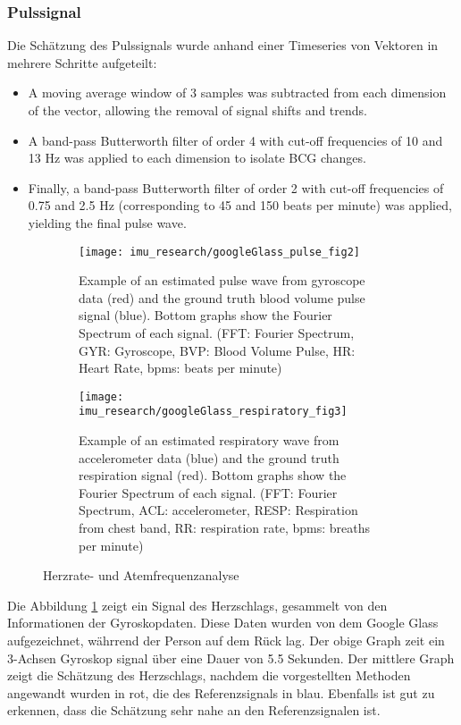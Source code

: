 \subsubsection{Pulssignal}
Die Schätzung des Pulssignals wurde anhand einer Timeseries von Vektoren in mehrere Schritte aufgeteilt:
\begin{itemize}
    \item A moving average window of 3 samples was subtracted from each dimension of the vector,  allowing the removal of signal shifts and trends.
    \item A band-pass Butterworth filter of order 4 with cut-off frequencies of 10 and 13  Hz was applied to each dimension to isolate BCG changes.
    \item Finally, a band-pass Butterworth filter of order 2 with cut-off frequencies of 0.75 and 2.5 Hz (corresponding to 45 and 150 beats per minute) was applied, yielding the final pulse wave.
\end{itemize}

\begin{figure}[ht]
    \centering
    \begin{subfigure}{.49\textwidth}
        \texttt{[image: imu\_research/googleGlass\_pulse\_fig2]}
      \caption{Example of an estimated pulse wave from gyroscope data (red) and the ground truth blood volume pulse signal (blue). Bottom graphs show the Fourier Spectrum of each signal. (FFT: Fourier Spectrum, GYR: Gyroscope, BVP: Blood Volume Pulse, HR: Heart Rate, bpms: beats per minute)
      }
      \label{background:googleGlass:pulse_wave}
    \end{subfigure}
    \begin{subfigure}{.49\textwidth}
        \texttt{[image: imu\_research/googleGlass\_respiratory\_fig3]}
      \caption{Example of an estimated respiratory wave from accelerometer data (blue) and the ground truth respiration signal (red). Bottom graphs show the Fourier Spectrum of each signal. (FFT: Fourier Spectrum, ACL: accelerometer, RESP: Respiration from chest band, RR: respiration rate, bpms: breaths per minute)
      }
      \label{background:googleGlass:respiratory_wave}
    \end{subfigure}
    \caption{Herzrate- und Atemfrequenzanalyse}
    \label{background:googleGlass}
  \end{figure}

Die Abbildung \ref{background:googleGlass:pulse_wave} zeigt ein Signal des Herzschlags, gesammelt von den Informationen der Gyroskopdaten. Diese Daten wurden von dem Google Glass aufgezeichnet, währrend der Person auf dem Rück lag. Der obige Graph zeit ein 3-Achsen Gyroskop signal über eine Dauer von 5.5 Sekunden. Der mittlere Graph zeigt die Schätzung des Herzschlags, nachdem die vorgestellten Methoden angewandt wurden in rot, die des Referenzsignals in blau. Ebenfalls ist gut zu erkennen, dass die Schätzung sehr nahe an den Referenzsignalen ist.

